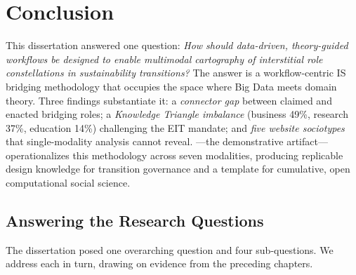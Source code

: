 \documentclass[../main.tex]{subfiles}
\begin{document}
\chapter{Conclusion}
\margintoc

\begin{chapteroverview}
This dissertation answered one question: \emph{How should data-driven, theory-guided workflows be designed to enable multimodal cartography of interstitial role constellations in sustainability transitions?} The answer is a workflow-centric IS bridging methodology \parencite{maass2018data} that occupies the space where Big Data meets domain theory. Three findings substantiate it: a \emph{connector gap} between claimed and enacted bridging roles; a \emph{Knowledge Triangle imbalance} (business 49\%, research 37\%, education 14\%) challenging the EIT mandate; and \emph{five website sociotypes} that single-modality analysis cannot reveal. \RoleBox{}---the demonstrative artifact---operationalizes this methodology across seven modalities, producing replicable design knowledge for transition governance and a template for cumulative, open computational social science.
\end{chapteroverview}

\section{Answering the Research Questions}

The dissertation posed one overarching question and four sub-questions. We address each in turn, drawing on evidence from the preceding chapters.
\end{document}
